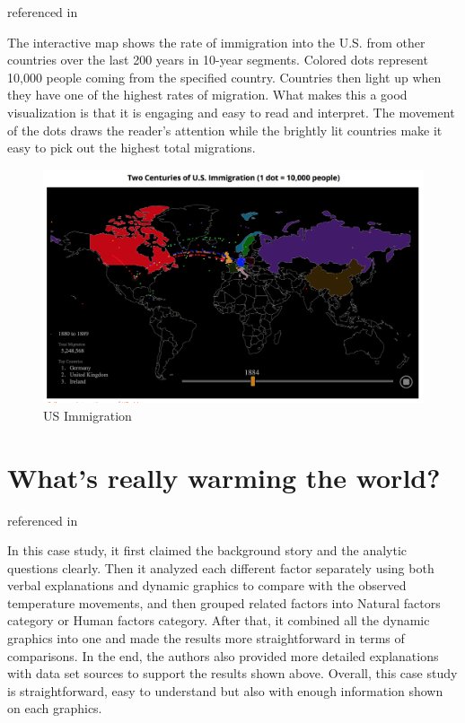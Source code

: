 \documentclass[]{book}
\theoremstyle{definition}
\theoremstyle{definition}
\theoremstyle{definition}
\theoremstyle{remark}
\begin{document}
\citep{Immigration} referenced in \citep{cool_data}

The interactive map shows the rate of immigration into the U.S. from
other countries over the last 200 years in 10-year segments. Colored
dots represent 10,000 people coming from the specified country.
Countries then light up when they have one of the highest rates of
migration. What makes this a good visualization is that it is engaging
and easy to read and interpret. The movement of the dots draws the
reader's attention while the brightly lit countries make it easy to pick
out the highest total migrations.

\begin{figure}
\centering
\includegraphics{images/immigration.png}
\caption{US Immigration}
\end{figure}

\section{What's really warming the
world?}\label{whats-really-warming-the-world}

\citep{world_warming} referenced in \citep{int_viz_1}

In this case study, it first claimed the background story and the
analytic questions clearly. Then it analyzed each different factor
separately using both verbal explanations and dynamic graphics to
compare with the observed temperature movements, and then grouped
related factors into Natural factors category or Human factors category.
After that, it combined all the dynamic graphics into one and made the
results more straightforward in terms of comparisons. In the end, the
authors also provided more detailed explanations with data set sources
to support the results shown above. Overall, this case study is
straightforward, easy to understand but also with enough information
shown on each graphics.
\end{document}
